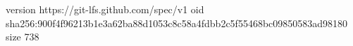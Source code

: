 version https://git-lfs.github.com/spec/v1
oid sha256:900f4f96213b1e3a62ba88d1053c8c58a4fdbb2c5f55468bc09850583ad98180
size 738

